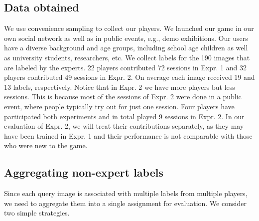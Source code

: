 \subsection{Data obtained}
We use convenience sampling to collect our players. %
We launched our game in our own social network as well as in public events, e.g., demo exhibitions. 
Our users have a diverse background and age groups, including school age children
as well as university students, researchers, etc. 
%
We collect labels for the 190 images that are labeled by the experts.  %
22 players contributed 72 sessions in Expr. 1 and 32 players contributed 49 sessions in Expr. 2. 
On average each image received 19 and 13 labels, respectively.
%
%
Notice that in Expr. 2 we have more players but less sessions. This is because most
of the sessions of Expr. 2 were done in a public event, where people typically 
try out for just one session.  
%
%
Four players have participated both experiments and in total played 9 sessions in Expr. 2. 
In our evaluation of Expr. 2, we will treat their contributions separately, as they may have been 
trained in Expr. 1 and their performance is not comparable with those who were new to the game.

\subsection{Aggregating non-expert labels}
Since each query image is associated with multiple labels from multiple players, we 
need to aggregate them into a single assignment for evaluation.
%
We consider two simple strategies. 

